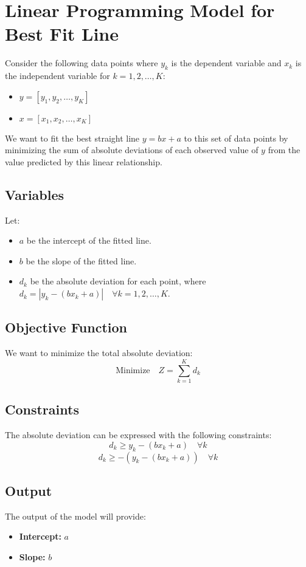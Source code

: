 \documentclass{article}
\begin{document}
\section*{Linear Programming Model for Best Fit Line}

Consider the following data points where \( y_k \) is the dependent variable and \( x_k \) is the independent variable for \( k = 1, 2, \ldots, K \):

\begin{itemize}
    \item \( y = [y_1, y_2, \ldots, y_K] \)
    \item \( x = [x_1, x_2, \ldots, x_K] \)
\end{itemize}

We want to fit the best straight line \( y = bx + a \) to this set of data points by minimizing the sum of absolute deviations of each observed value of \( y \) from the value predicted by this linear relationship.

\subsection*{Variables}
Let:
\begin{itemize}
    \item \( a \) be the intercept of the fitted line.
    \item \( b \) be the slope of the fitted line.
    \item \( d_k \) be the absolute deviation for each point, where \( d_k = |y_k - (bx_k + a)| \quad \forall k = 1, 2, \ldots, K \).
\end{itemize}

\subsection*{Objective Function}
We want to minimize the total absolute deviation:
\[
\text{Minimize} \quad Z = \sum_{k=1}^{K} d_k
\]

\subsection*{Constraints}
The absolute deviation can be expressed with the following constraints:
\[
d_k \geq y_k - (bx_k + a) \quad \forall k
\]
\[
d_k \geq -(y_k - (bx_k + a)) \quad \forall k
\]

\subsection*{Output}
The output of the model will provide:
\begin{itemize}
    \item \textbf{Intercept:} \( a \)
    \item \textbf{Slope:} \( b \)
\end{itemize}
\end{document}

